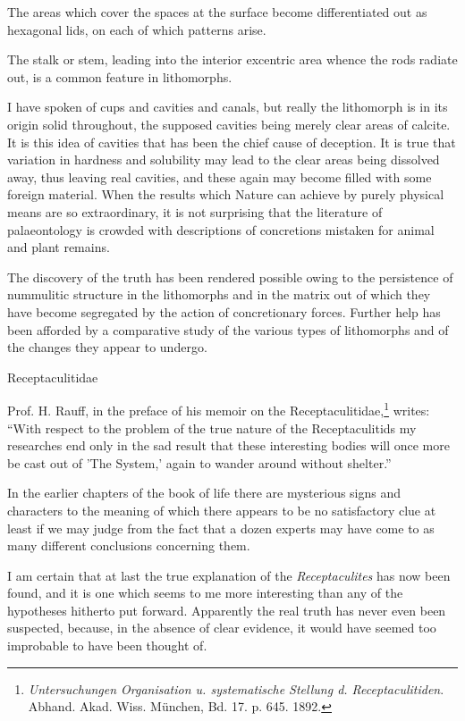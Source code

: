 \documentclass[a4paper, 12pt, oneside]{article}
\begin{document}
The areas which cover the spaces at the surface become differentiated out as hexagonal lids, on each of which patterns arise.

The stalk or stem, leading into the interior excentric area whence the rods radiate out, is a common feature in lithomorphs.

I have spoken of cups and cavities and canals, but really the lithomorph is in its origin solid throughout, the supposed cavities being merely clear areas of calcite. It is this idea of cavities that has been the chief cause of deception. It is true that variation in hardness and solubility may lead to the clear areas being dissolved away, thus leaving real cavities, and these again may become filled with some foreign material. When the results which Nature can achieve by purely physical means are so extraordinary, it is not surprising that the literature of palaeontology is crowded with descriptions of concretions mistaken for animal and plant remains.

The discovery of the truth has been rendered possible owing to the persistence of nummulitic structure in the lithomorphs and in the matrix out of which they have become segregated by the action of concretionary forces. Further help has been afforded by a comparative study of the various types of lithomorphs and of the changes they appear to undergo.

Receptaculitidae

Prof. H. Rauff, in the preface of his memoir on the Receptaculitidae,\footnote{\emph{Untersuchungen Organisation u. systematische Stellung d. Receptaculitiden}. Abhand. Akad. Wiss. München, Bd. 17. p. 645. 1892.} writes: ``With respect to the problem of the true nature of the Receptaculitids my researches end only in the sad result that these interesting bodies will once more be cast out of 'The System,' again to wander around without shelter.''

In the earlier chapters of the book of life there are mysterious signs and characters to the meaning of which there appears to be no satisfactory clue at least if we may judge from the fact that a dozen experts may have come to as many different conclusions concerning them.

I am certain that at last the true explanation of the \emph{Receptaculites} has now been found, and it is one which seems to me more interesting than any of the hypotheses hitherto put forward. Apparently the real truth has never even been suspected, because, in the absence of clear evidence, it would have seemed too improbable to have been thought of.
\end{document}
